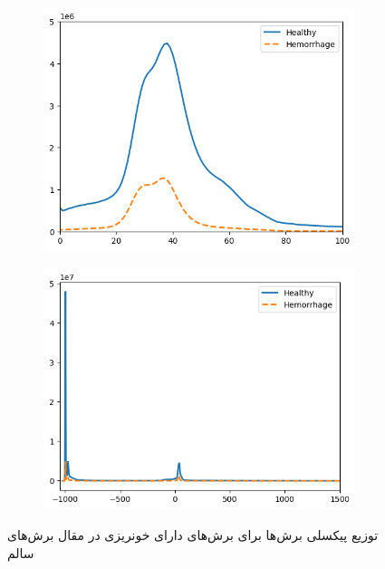  \begin{figure}[ht]
		\centering %
		\begin{subfigure}{0.45\textwidth}
			\includegraphics[width=\linewidth]{Images/Chapter2/Pixel histogram.png}
			\caption{}
			\label{fig: ch2-slice hist whole}
		\end{subfigure}\hfil %
		\begin{subfigure}{0.45\textwidth}
			\includegraphics[width=\linewidth,]{Images/Chapter2/Pixel histogram lim.png}
			\caption{}
			\label{fig: ch2-slice hist lim}
		\end{subfigure}
			\caption{توزیع پیکسلی برش‌ها برای برش‌های دارای خونریزی در مقال برش‌های سالم}
		\label{fig: ch2-slice hist}
\end{figure} 

